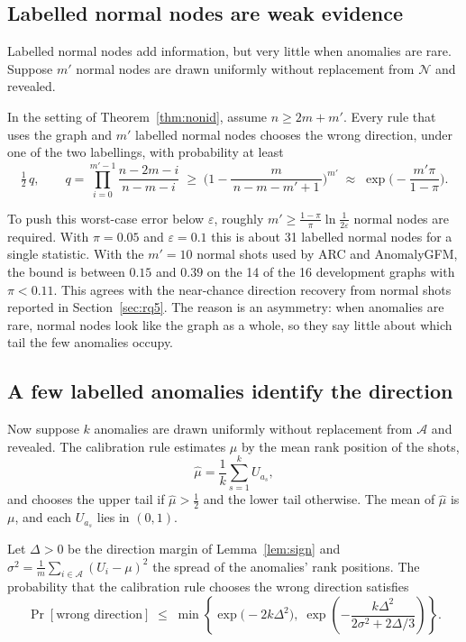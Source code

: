 \subsection{Labelled normal nodes are weak evidence}

Labelled normal nodes add information, but very little when anomalies are rare. Suppose $m'$ normal nodes are drawn uniformly without replacement from $\mathcal{N}$ and revealed.

\begin{theorem}\label{thm:normal}
In the setting of Theorem~\ref{thm:nonid}, assume $n \ge 2m + m'$. Every rule that uses the graph and $m'$ labelled normal nodes chooses the wrong direction, under one of the two labellings, with probability at least
\[
\tfrac12\,q, \qquad
q = \prod_{i=0}^{m'-1}\frac{n-2m-i}{\,n-m-i\,} \;\ge\; \Big(1 - \frac{m}{\,n-m-m'+1\,}\Big)^{m'} \;\approx\; \exp\!\Big(-\frac{m'\pi}{1-\pi}\Big).
\]
\end{theorem}

To push this worst-case error below $\varepsilon$, roughly $m' \ge \frac{1-\pi}{\pi}\ln\frac{1}{2\varepsilon}$ normal nodes are required. With $\pi = 0.05$ and $\varepsilon = 0.1$ this is about 31 labelled normal nodes for a single statistic. With the $m' = 10$ normal shots used by ARC and AnomalyGFM, the bound is between $0.15$ and $0.39$ on the 14 of the 16 development graphs with $\pi < 0.11$. This agrees with the near-chance direction recovery from normal shots reported in Section~\ref{sec:rq5}. The reason is an asymmetry: when anomalies are rare, normal nodes look like the graph as a whole, so they say little about which tail the few anomalies occupy.

\subsection{A few labelled anomalies identify the direction}

Now suppose $k$ anomalies are drawn uniformly without replacement from $\mathcal{A}$ and revealed. The calibration rule estimates $\mu$ by the mean rank position of the shots,
\[
\hat\mu = \frac1k \sum_{s=1}^{k} U_{a_s},
\]
and chooses the upper tail if $\hat\mu > \tfrac12$ and the lower tail otherwise. The mean of $\hat\mu$ is $\mu$, and each $U_{a_s}$ lies in $(0,1)$.

\begin{theorem}\label{thm:anomaly}
Let $\Delta > 0$ be the direction margin of Lemma~\ref{lem:sign} and $\sigma^2 = \frac1m \sum_{i \in \mathcal{A}} (U_i - \mu)^2$ the spread of the anomalies' rank positions. The probability that the calibration rule chooses the wrong direction satisfies
\[
\Pr[\text{wrong direction}] \;\le\; \min\left\{ \exp\!\big(-2k\Delta^2\big),\;
\exp\!\left(-\frac{k\Delta^2}{2\sigma^2 + 2\Delta/3}\right)\right\}.
\]
\end{theorem}

